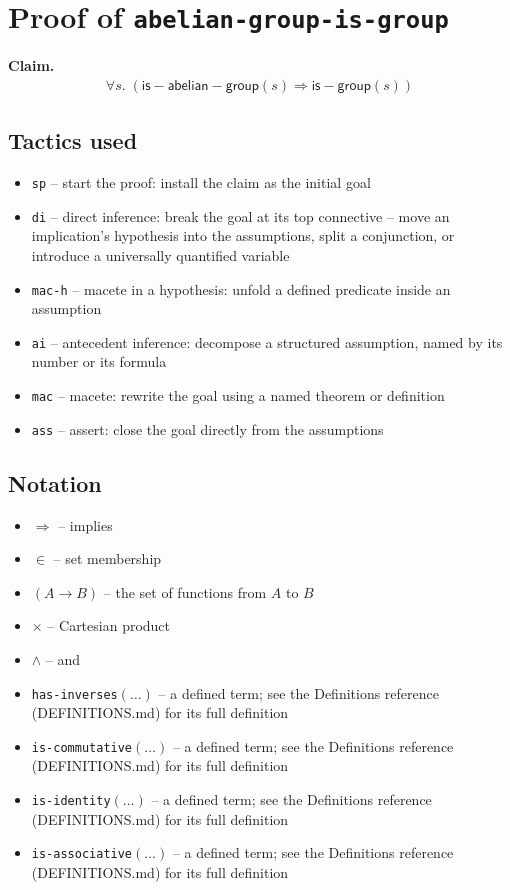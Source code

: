 \documentclass[11pt]{article}
\begin{document}
\section*{Proof of \texttt{abelian-group-is-group}}
\textbf{Claim.}
\begin{align*}
  \forall s.\; (\mathsf{is{-}abelian{-}group}(s) \Rightarrow \mathsf{is{-}group}(s))
\end{align*}
\bigskip

\subsection*{Tactics used}
\begin{itemize}
\item \texttt{sp} -- start the proof: install the claim as the initial goal
\item \texttt{di} -- direct inference: break the goal at its top connective -- move an implication's hypothesis into the assumptions, split a conjunction, or introduce a universally quantified variable
\item \texttt{mac-h} -- macete in a hypothesis: unfold a defined predicate inside an assumption
\item \texttt{ai} -- antecedent inference: decompose a structured assumption, named by its number or its formula
\item \texttt{mac} -- macete: rewrite the goal using a named theorem or definition
\item \texttt{ass} -- assert: close the goal directly from the assumptions
\end{itemize}

\subsection*{Notation}
\begin{itemize}
\item $\Rightarrow$ -- implies
\item $\in$ -- set membership
\item $(A \to B)$ -- the set of functions from $A$ to $B$
\item $\times$ -- Cartesian product
\item $\wedge$ -- and
\item \texttt{has-inverses}$(\ldots)$ -- a defined term; see the Definitions reference (DEFINITIONS.md) for its full definition
\item \texttt{is-commutative}$(\ldots)$ -- a defined term; see the Definitions reference (DEFINITIONS.md) for its full definition
\item \texttt{is-identity}$(\ldots)$ -- a defined term; see the Definitions reference (DEFINITIONS.md) for its full definition
\item \texttt{is-associative}$(\ldots)$ -- a defined term; see the Definitions reference (DEFINITIONS.md) for its full definition
\end{itemize}
\end{document}
